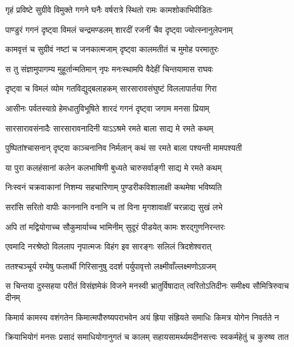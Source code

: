 
\twolineshloka
{गृहं प्रविष्टे सुग्रीवे विमुक्ते गगने घनैः}
{वर्षरात्रे स्थितो रामः कामशोकाभिपीडितः} %

\twolineshloka
{पाण्डुरं गगनं दृष्ट्वा विमलं चन्द्रमण्डलम्}
{शारदीं रजनीं चैव दृष्ट्वा ज्योत्स्नानुलेपनाम्} %

\twolineshloka
{कामवृत्तं च सुग्रीवं नष्टां च जनकात्मजाम्}
{दृष्ट्वा कालमतीतं च मुमोह परमातुरः} %

\twolineshloka
{स तु संज्ञामुपागम्य मुहूर्तान्मतिमान् नृपः}
{मनःस्थामपि वैदेहीं चिन्तयामास राघवः} %

\twolineshloka
{दृष्ट्वा च विमलं व्योम गतविद्युद्बलाहकम्}
{सारसारावसंघुष्टं विललापार्तया गिरा} %

\twolineshloka
{आसीनः पर्वतस्याग्रे हेमधातुविभूषिते}
{शारदं गगनं दृष्ट्वा जगाम मनसा प्रियाम्} %

\twolineshloka
{सारसारावसंनादैः सारसारावनादिनी}
{याऽऽश्रमे रमते बाला साद्य मे रमते कथम्} %

\twolineshloka
{पुष्पितांश्चासनान् दृष्ट्वा काञ्चनानिव निर्मलान्}
{कथं सा रमते बाला पश्यन्ती मामपश्यती} %

\twolineshloka
{या पुरा कलहंसानां कलेन कलभाषिणी}
{बुध्यते चारुसर्वाङ्गी साद्य मे रमते कथम्} %

\twolineshloka
{निःस्वनं चक्रवाकानां निशम्य सहचारिणाम्}
{पुण्डरीकविशालाक्षी कथमेषा भविष्यति} %

\twolineshloka
{सरांसि सरितो वापीः काननानि वनानि च}
{तां विना मृगशावाक्षीं चरन्नाद्य सुखं लभे} %

\twolineshloka
{अपि तां मद्वियोगाच्च सौकुमार्याच्च भामिनीम्}
{सुदूरं पीडयेत् कामः शरद्गुणनिरन्तरः} %

\twolineshloka
{एवमादि नरश्रेष्ठो विललाप नृपात्मजः}
{विहंग इव सारङ्गः सलिलं त्रिदशेश्वरात्} %

\twolineshloka
{ततश्चञ्चूर्य रम्येषु फलार्थी गिरिसानुषु}
{ददर्श पर्युपावृत्तो लक्ष्मीवाँल्लक्ष्मणोऽग्रजम्} %

\twolineshloka
{स चिन्तया दुस्सहया परीतं विसंज्ञमेकं विजने मनस्वी}
{भ्रातुर्विषादात् त्वरितोऽतिदीनः समीक्ष्य सौमित्रिरुवाच दीनम्} %

\twolineshloka
{किमार्य कामस्य वशंगतेन किमात्मपौरुष्यपराभवेन}
{अयं ह्रिया संह्रियते समाधिः किमत्र योगेन निवर्तते न} %

\twolineshloka
{क्रियाभियोगं मनसः प्रसादं समाधियोगानुगतं च कालम्}
{सहायसामर्थ्यमदीनसत्त्वः स्वकर्महेतुं च कुरुष्व तात} %

